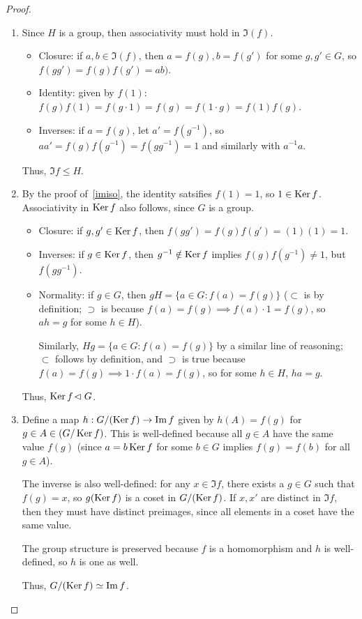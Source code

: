 \begin{proof}
\begin{enumerate}
\item Since $H$ is a group, then associativity must hold in $\Im(f)$.
\begin{itemize}
\item Closure: if $a,b\in\Im(f)$, then $a = f(g),b = f(g')$ for some $g,g'\in G$, so $f(gg') = f(g)f(g') = ab)$.
\item Identity: given by $f(1)$: $f(g)f(1) = f(g\cdot 1) = f(g) = f(1\cdot g) = f(1)f(g)$.
\item Inverses: if $a=f(g)$, let $a'=f(g^{-1})$, so $aa' = f(g)f(g^{-1}) = f(gg^{-1}) = 1$ and similarly with $a^{-1}a$.
\end{itemize}
Thus, $\Im f\le H$.
\item By the proof of~\ref{imiso}, the identity satsifies $f(1) = 1$, so $1\in\operatorname{Ker} f$. Associativity in $\operatorname{Ker} f$ also follows, since $G$ is a group.
\begin{itemize}
\item Closure: if $g,g'\in\operatorname{Ker} f$, then $f(gg') = f(g)f(g') = (1)(1) = 1$.
\item Inverses: if $g\in\operatorname{Ker} f$, then $g^{-1}\notin \operatorname{Ker} f$ implies $f(g)f(g^{-1})\ne 1$, but $f(gg^{-1})$.
\item Normality: if $g\in G$, then $gH = \{a\in G: f(a)=f(g)\}$ ($\subset$ is by definition; $\supset$ is because $f(a) = f(g)\implies f(a)\cdot 1 = f(g)$, so $ah = g$ for some $h\in H$).

Similarly, $Hg = \{a\in G:f(a) = f(g)\}$ by a similar line of reasoning; $\subset$ follows by definition, and $\supset$ is true because $f(a) = f(g)\implies 1\cdot f(a) =f(g)$, so for some $h\in H$, $ha = g$.
\end{itemize}
Thus, $\operatorname{Ker} f \!\vartriangleleft G$.
\item Define a map $h: G/(\operatorname{Ker} f) \to \operatorname{Im} f$ given by $h(A) = f(g)$ for $g\in A\in(G/\operatorname{Ker} f)$. This is well-defined because all $g\in A$ have the same value $f(g)$ (since $a = b\operatorname{Ker} f$ for some $b\in G$ implies $f(g) = f(b)$ for all $g\in A$).

The inverse is also well-defined: for any $x\in \Im f$, there exists a $g\in G$ such that $f(g) = x$, so $g(\operatorname{Ker} f)$ is a coset in $G/(\operatorname{Ker} f)$. If $x,x'$ are distinct in $\Im f$, then they must have distinct preimages, since all elements in a coset have the same value.

The group structure is preserved because $f$ is a homomorphism and $h$ is well-defined, so $h$ is one as well.

Thus, $G/(\operatorname{Ker} f) \simeq \operatorname{Im} f$.
\end{enumerate}
\end{proof}
